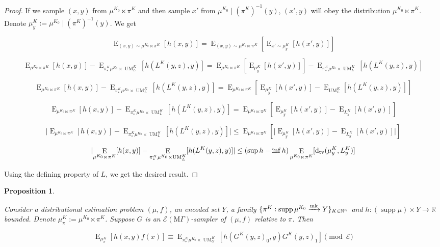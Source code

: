 \documentclass{article}
\numberwithin{equation}{section}
\theoremstyle{definition}
\theoremstyle{plain}
\newtheorem{proposition}{Proposition}[section]
\DeclareMathOperator{\Supp}{supp}
\DeclareMathOperator{\E}{E}
\DeclareMathOperator{\UM}{UM}
\newcommand{\Dtv}{\operatorname{d}_{\textnormal{tv}}}
\newcommand{\Nats}{\mathbb{N}}
\newcommand{\Reals}{\mathbb{R}}
\newcommand{\Abs}[1]{\lvert #1 \rvert}
\newcommand{\MGrow}{\mathrm{M}\Gamma}
\newcommand{\Fall}{\mathcal{E}}
\newcommand{\EMG}{\Fall(\MGrow)}
\newcommand{\Markov}{\xrightarrow{\textnormal{mk}}}
\begin{document}
\begin{proof}

If we sample $(x,y)$ from $\mu^{K_0} \ltimes \pi^K$ and then sample $x'$ from ${\mu^{K_0} \mid (\pi^K)^{-1}(y)}$, $(x',y)$ will obey the distribution $\mu^{K_0} \ltimes \pi^K$. Denote $\mu_y^K:=\mu^{K_0} \mid (\pi^K)^{-1}(y)$. We get

$$\E_{(x,y) \sim \mu^{K_0} \ltimes \pi^K}[h(x,y)] = \E_{(x,y) \sim \mu^{K_0} \ltimes \pi^K}[\E_{x' \sim \mu_y^K}[h(x',y)]]$$

$$\E_{\mu^{K_0} \ltimes \pi^K}[h(x,y)] - \E_{\pi_*^K\mu^{K_0} \times \UM_L^K}[h(L^K(y,z),y)] = \E_{\mu^{K_0} \ltimes \pi^K}[\E_{\mu_y^K}[h(x',y)]] - \E_{\pi_*^K\mu^{K_0} \times \UM_L^K}[h(L^K(y,z),y)]$$

$$\E_{\mu^{K_0} \ltimes \pi^K}[h(x,y)] - \E_{\pi_*^K\mu^{K_0} \times \UM_L^K}[h(L^K(y,z),y)] = \E_{\mu^{K_0} \ltimes \pi^K}[\E_{\mu_y^K}[h(x',y)]-\E_{\UM_L^K}[h(L^K(y,z),y)]]$$

$$\E_{\mu^{K_0} \ltimes \pi^K}[h(x,y)] - \E_{\pi_*^K\mu^{K_0} \times \UM_L^K}[h(L^K(y,z),y)] = \E_{\mu^{K_0} \ltimes \pi^K}[\E_{\mu_y^K}[h(x',y)]-\E_{L_y^K}[h(x',y)]]$$

$$\Abs{\E_{\mu^{K_0} \ltimes \pi^K}[h(x,y)] - \E_{\pi_*^K\mu^{K_0} \times \UM_L^K}[h(L^K(y,z),y)]} \leq \E_{\mu^{K_0} \ltimes \pi^K}[\Abs{\E_{\mu_y^K}[h(x',y)]-\E_{L_y^K}[h(x',y)]}]$$

$$\Abs{\E_{\mu^{K_0} \ltimes \pi^K}[h(x,y)] - \E_{\pi_*^K\mu^{K_0} \times \UM_L^K}[h(L^K(y,z),y)]} \leq (\sup h - \inf h) \E_{\mu^{K_0} \ltimes \pi^K}[\Dtv(\mu_y^K,L_y^K)]$$

Using the defining property of $L$, we get the desired result.
\end{proof}

\begin{proposition}
\label{prp:gen}

Consider a distributional estimation problem $(\mu,f)$, an encoded set $Y$, a family ${\{\pi^K: \Supp \mu^{K_0} \Markov Y\}_{K \in \Nats^n}}$ and ${h: (\Supp \mu) \times Y \rightarrow \Reals}$ bounded. Denote $\mu_\pi^K:=\mu^{K_0} \ltimes \pi^K$. Suppose $G$ is an $\EMG$-sampler of $(\mu,f)$ relative to $\pi$. Then

\begin{equation}
\E_{\mu_\pi^K}[h(x,y)f(x)] \equiv \E_{\pi_*^K\mu^{K_0} \times \UM_G^K}[h(G^K(y,z)_0,y)G^K(y,z)_1] \pmod \Fall
\end{equation}

\end{proposition}
\end{document}
